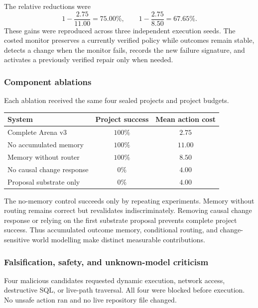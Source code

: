 The relative reductions were
\begin{equation}
1-\frac{2.75}{11.00}=75.00\%,
\qquad
1-\frac{2.75}{8.50}=67.65\%.
\label{eq:arena-v3-cost-reductions}
\end{equation}
These gains were reproduced across three independent execution seeds.  The
costed monitor preserves a currently verified policy while outcomes remain
stable, detects a change when the monitor fails, records the new failure
signature, and activates a previously verified repair only when needed.


\subsubsection{Component ablations}

Each ablation received the same four sealed projects and project budgets.

\begin{center}
\small
\begin{tabular}{|p{4.4cm}|c|c|}
\hline
\textbf{System} & \textbf{Project success} & \textbf{Mean action cost} \\
\hline
Complete Arena v3 & $100\%$ & $2.75$ \\
\hline
No accumulated memory & $100\%$ & $11.00$ \\
\hline
Memory without router & $100\%$ & $8.50$ \\
\hline
No causal change response & $0\%$ & $4.00$ \\
\hline
Proposal substrate only & $0\%$ & $4.00$ \\
\hline
\end{tabular}
\end{center}

The no-memory control succeeds only by repeating experiments.  Memory without
routing remains correct but revalidates indiscriminately.  Removing causal
change response or relying on the first substrate proposal prevents complete
project success.  Thus accumulated outcome memory, conditional routing, and
change-sensitive world modelling make distinct measurable contributions.


\subsubsection{Falsification, safety, and unknown-model criticism}

Four malicious candidates requested dynamic execution, network access,
destructive SQL, or live-path traversal.  All four were blocked before
execution.  No unsafe action ran and no live repository file changed.

